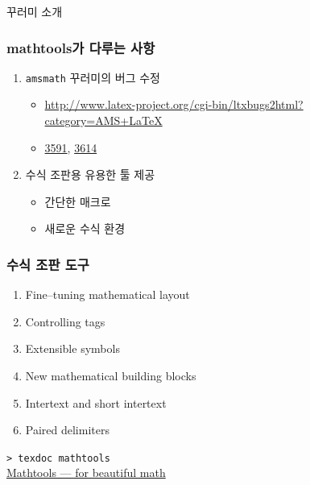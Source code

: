 \documentclass{beamer}
\begin{document}
\begin{frame}
\huge
\centering 꾸러미 소개
\end{frame}

\begin{frame}[t]
\frametitle{mathtools가 다루는 사항}
\begin{enumerate}
\item \texttt{amsmath} 꾸러미의 버그 수정  
\begin{itemize}
\item \url{http://www.latex-project.org/cgi-bin/ltxbugs2html?
category=AMS+LaTeX}
\item \href{http://www.latex-project.org/cgi-bin/ltxbugs2html?
pr=amslatex/3591&category=AMS+LaTeX}{3591}, \href{http://
www.latex-project.org/cgi-bin/ltxbugs2html?pr=amslatex/
3614&category=AMS+LaTeX}{3614}
\end{itemize}
\item 수식 조판용 유용한 툴 제공 
\begin{itemize}
\item 간단한 매크로 
\item 새로운 수식 환경
\end{itemize}
\end{enumerate}
\end{frame}

\begin{frame}[t]
\frametitle{수식 조판 도구}
\begin{enumerate}
\item \alert{Fine--tuning mathematical layout}
\item Controlling tags
\item Extensible symbols
\item \alert{New mathematical building blocks}
\item Intertext and short intertext
\item \alert{Paired delimiters}
\end{enumerate}
\begin{center}
\texttt{> texdoc mathtools}\\
\href{https://ko.sharelatex.com/blog/2012/06/12/mathtools-for-beautiful-math.html}{Mathtools --- for beautiful math}
\end{center}
\end{frame}

\end{document}

